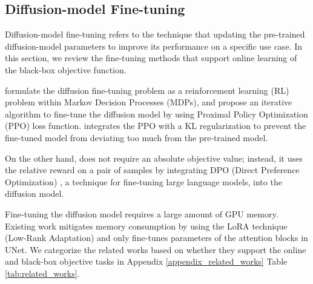 
\subsection{Diffusion-model Fine-tuning}
Diffusion-model fine-tuning refers to the technique that updating the pre-trained diffusion-model parameters to improve its performance on a specific use case. In this section, we review the fine-tuning methods that support online learning of the black-box objective function.

\cite{black2023training,fan2024reinforcement} formulate the diffusion fine-tuning problem as a reinforcement learning (RL) problem within Markov Decision Processes (MDPs), and propose an iterative algorithm to fine-tune the diffusion model by using Proximal Policy Optimization (PPO) \citep{schulman2017equivalence,uehara2024understanding} loss function. \cite{fan2024reinforcement} integrates the PPO with a KL regularization to prevent the fine-tuned model from deviating too much from the pre-trained model. 

On the other hand, \cite{yang2024using} does not require an absolute objective value; instead, it uses the relative reward on a pair of samples by integrating DPO (Direct Preference Optimization) \citep{rafailov2024direct}, a technique for fine-tuning large language models, into the diffusion model.

Fine-tuning the diffusion model requires a large amount of GPU memory. Existing work mitigates memory consumption by using the LoRA technique (Low-Rank Adaptation) \citep{hu2021lora} and only fine-tunes parameters of the attention blocks in UNet. We categorize the related works based on whether they support the online and black-box objective tasks in Appendix \ref{appendix_related_works} Table \ref{tab:related_works}.
